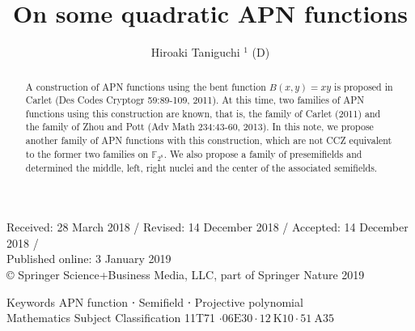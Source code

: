 \documentclass[10pt]{article}
\title{On some quadratic APN functions }
\author{Hiroaki Taniguchi ${ }^{1}$ (D)}
\date{}
\begin{document}
\maketitle
Received: 28 March 2018 / Revised: 14 December 2018 / Accepted: 14 December 2018 /\\
Published online: 3 January 2019\\
© Springer Science+Business Media, LLC, part of Springer Nature 2019

\begin{abstract}
A construction of APN functions using the bent function $B(x, y)=x y$ is proposed in Carlet (Des Codes Cryptogr 59:89-109, 2011). At this time, two families of APN functions using this construction are known, that is, the family of Carlet (2011) and the family of Zhou and Pott (Adv Math 234:43-60, 2013). In this note, we propose another family of APN functions with this construction, which are not CCZ equivalent to the former two families on $\mathbb{F}_{2^{8}}$. We also propose a family of presemifields and determined the middle, left, right nuclei and the center of the associated semifields.
\end{abstract}

Keywords APN function ⋅ Semifield ⋅ Projective polynomial\\
Mathematics Subject Classification 11T71 $\cdot 06 \mathrm{E} 30 \cdot 12 \mathrm{~K} 10 \cdot 51 \mathrm{~A} 35$
\end{document}
